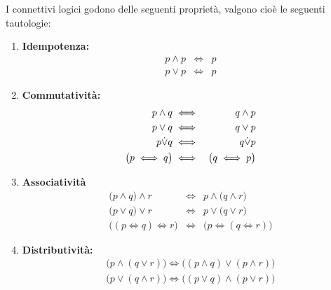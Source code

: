 \begin{propbox}
	I connettivi logici godono delle seguenti proprietà, valgono cioè le seguenti tautologie:
	\begin{enumerate}
		\item \textbf{Idempotenza:}
		\begin{eqnarray}
			p \land p &\iff& p \\
			p \lor p &\iff& p
		\end{eqnarray}
		\item \textbf{Commutatività:}
		\begin{eqnarray}
			p \land q &\iff& q \land p \\
			p \lor q &\iff& q \lor p \\
			p {\displaystyle{\dot{\vee}}} q &\iff& q {\displaystyle{\dot{\vee}}} p \\
			\bigl(p \iff q\bigr) &\iff& \bigl(q \iff p\bigr)
		\end{eqnarray}
		\item \textbf{Associatività}
		\begin{eqnarray}
			\bigl(p \land q\bigr) \land r &\iff& p \land \bigl(q \land r\bigr)\\
			\bigl(p \lor q\bigr) \lor r &\iff& p \lor \bigl(q \lor r\bigr)\\
			\bigl((p \iff q) \iff r\bigr) &\iff& \bigl(p \iff (q \iff r)\bigr) \label{eq:associativity_logical_equivalence}
		\end{eqnarray}
		\item \textbf{Distributività:}
		\begin{eqnarray}
			\bigl(p \land (q \lor r)\bigr) \iff \bigl((p \land q) \lor (p \land r)\bigr)\\
			\bigl(p \lor (q \land r)\bigr) \iff \bigl((p \lor q) \land (p \lor r)\bigr)
		\end{eqnarray}
	\end{enumerate}
\end{propbox}

